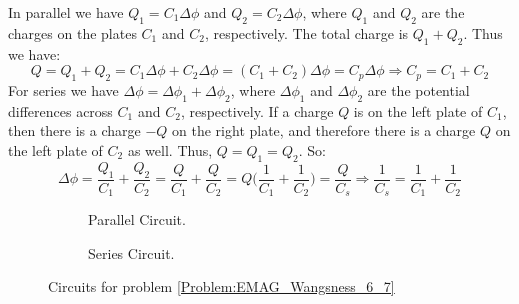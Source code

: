             In parallel we have $Q_{1}=C_{1}\Delta\phi$
            and $Q_{2}=C_{2}\Delta\phi$,
            where $Q_{1}$ and $Q_{2}$ are the charges on the
            plates $C_{1}$ and $C_{2}$, respectively.
            The total charge is $Q_{1}+Q_{2}$. Thus we have:
            \begin{equation*}
                Q=Q_{1}+Q_{2}
                 =C_{1}\Delta\phi+C_{2}\Delta\phi
                 =(C_{1}+C_{2})\Delta\phi
                 =C_{p}\Delta\phi
                \Rightarrow{C_{p}}=C_{1}+C_{2}
            \end{equation*}
            For series we have
            $\Delta\phi=\Delta\phi_{1}+\Delta\phi_{2}$,
            where $\Delta\phi_{1}$ and $\Delta\phi_{2}$
            are the potential differences across $C_{1}$ and $C_{2}$,
            respectively. If a charge $Q$ is on the left plate
            of $C_{1}$, then there is a charge $-Q$ on the right
            plate, and therefore there is a charge $Q$ on the
            left plate of $C_{2}$ as well. Thus, $Q=Q_{1}=Q_{2}$.
            So:
            \begin{equation*}
                \Delta\phi=\frac{Q_{1}}{C_{1}}+\frac{Q_{2}}{C_{2}}
                =\frac{Q}{C_{1}}+\frac{Q}{C_{2}}
                =Q\big(\frac{1}{C_{1}}+\frac{1}{C_{2}}\big)
                =\frac{Q}{C_{s}}
                \Rightarrow\frac{1}{C_{s}}
                =\frac{1}{C_{1}}+\frac{1}{C_{2}}
            \end{equation*}
            \begin{figure}
                \centering
                \captionsetup{type=figure}
                \begin{subfigure}[b]{0.49\textwidth}
                    \centering
                    \captionsetup{type=figure}
                    
                    \caption{Parallel Circuit.}
                    \label{fig:EMAG_Parallel_Circuit}
                \end{subfigure}
                \begin{subfigure}[b]{0.49\textwidth}
                    \centering
                    \captionsetup{type=figure}
                    
                    \caption{Series Circuit.}
                    \label{fig:EMAG_Series_Circuit}
                \end{subfigure}
                \caption{%
                    Circuits for problem
                    \ref{Problem:EMAG_Wangsness_6_7}
                }
                \label{fig:EMAG_Wangsness_6_7}
            \end{figure}
